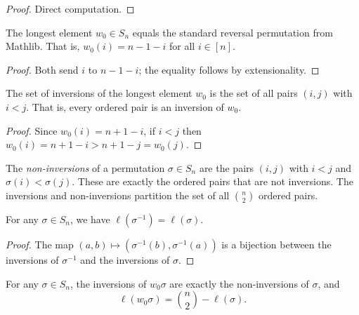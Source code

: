 \begin{proof}
\leanok
Direct computation.
\end{proof}

\begin{lemma}
\label{lem.perm.longestElement_eq_revPerm}
\leanhelper
\leanok
The longest element $w_0 \in S_n$ equals the standard reversal
permutation from Mathlib. That is, $w_0(i) = n - 1 - i$ for all $i \in [n]$.
\end{lemma}

\begin{proof}
\leanok
Both send $i$ to $n - 1 - i$; the equality follows by extensionality.
\end{proof}

\begin{lemma}
\label{lem.perm.inv_longestElement}
\leanhelper
\leanok
The set of inversions of the longest element $w_0$ is the set of all pairs $(i,j)$
with $i < j$. That is, every ordered pair is an inversion of $w_0$.
\end{lemma}

\begin{proof}
\leanok
Since $w_0(i) = n+1-i$, if $i < j$ then $w_0(i) = n+1-i > n+1-j = w_0(j)$.
\end{proof}

\begin{definition}
\label{def.perm.nonInv}
\leanhelper
\leanok
The \emph{non-inversions} of a permutation $\sigma \in S_n$ are the pairs $(i,j)$
with $i < j$ and $\sigma(i) < \sigma(j)$. These are exactly the ordered pairs
that are not inversions. The inversions and non-inversions partition the set of
all $\binom{n}{2}$ ordered pairs.
\end{definition}

\begin{lemma}
\label{lem.perm.invCount_inv}
\leanhelper
\leanok
For any $\sigma \in S_n$, we have $\ell(\sigma^{-1}) = \ell(\sigma)$.
\end{lemma}

\begin{proof}
\leanok
The map $(a,b) \mapsto (\sigma^{-1}(b), \sigma^{-1}(a))$ is a bijection between
the inversions of $\sigma^{-1}$ and the inversions of $\sigma$.
\end{proof}

\begin{lemma}
\label{lem.perm.invCount_longestElement_mul}
\leanhelper
\leanok
For any $\sigma \in S_n$, the inversions of $w_0 \sigma$ are exactly the non-inversions of $\sigma$, and
\[
\ell(w_0 \sigma) = \binom{n}{2} - \ell(\sigma).
\]
\end{lemma}

